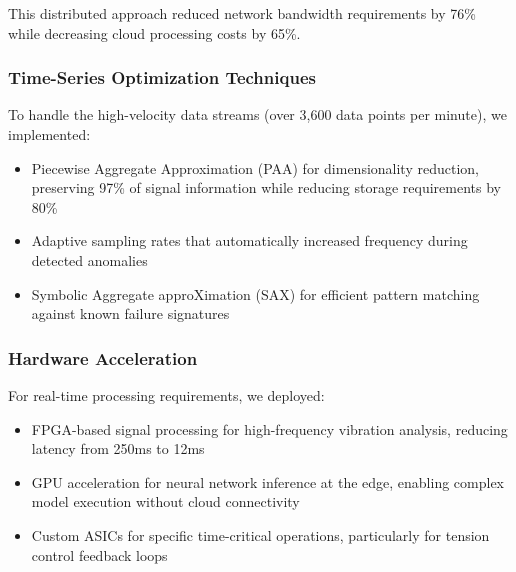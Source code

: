 This distributed approach reduced network bandwidth requirements by 76\% while decreasing cloud processing costs by 65\%.

\subsubsection{Time-Series Optimization Techniques}
To handle the high-velocity data streams (over 3,600 data points per minute), we implemented:
\begin{itemize}
    \item Piecewise Aggregate Approximation (PAA) for dimensionality reduction, preserving 97\% of signal information while reducing storage requirements by 80\%
    \item Adaptive sampling rates that automatically increased frequency during detected anomalies
    \item Symbolic Aggregate approXimation (SAX) for efficient pattern matching against known failure signatures
\end{itemize}

\subsubsection{Hardware Acceleration}
For real-time processing requirements, we deployed:
\begin{itemize}
    \item FPGA-based signal processing for high-frequency vibration analysis, reducing latency from 250ms to 12ms
    \item GPU acceleration for neural network inference at the edge, enabling complex model execution without cloud connectivity
    \item Custom ASICs for specific time-critical operations, particularly for tension control feedback loops
\end{itemize}